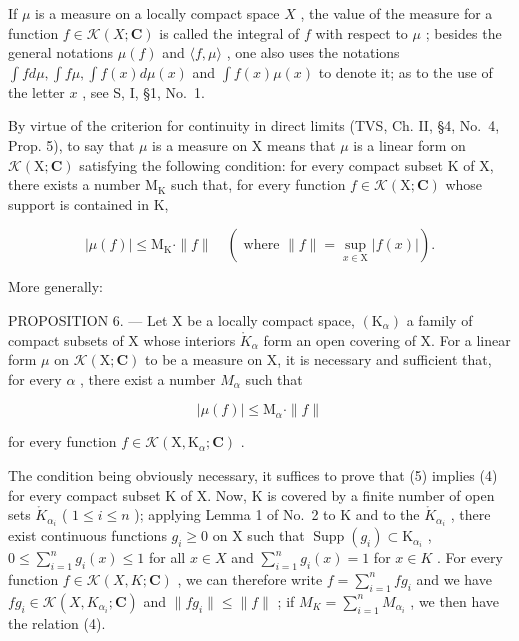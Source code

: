If \(\mu\) is a measure on a locally compact space \(X\) , the value of the measure for a function \(f \in \mathcal{K}(X; \mathbf{C})\) is called the integral of \(f\) with respect to \(\mu\) ; besides the general notations \(\mu(f)\) and \(\langle f, \mu \rangle\) , one also uses the notations \(\int f d\mu, \int f\mu, \int f(x) d\mu(x)\) and \(\int f(x)\mu(x)\) to denote it; as to the use of the letter \(x\) , see S, I, §1, No.~1.

By virtue of the criterion for continuity in direct limits (TVS, Ch. II, §4, No.~4, Prop. 5), to say that \(\mu\) is a measure on X means that \(\mu\) is a linear form on \(\mathcal{K}(\mathrm{X};\mathbf{C})\) satisfying the following condition: for every compact subset K of X, there exists a number \(\mathrm{M_K}\) such that, for every function \(f\in \mathcal{K}(\mathrm{X};\mathbf{C})\) whose support is contained in K,

\[
| \mu (f) | \leqslant \mathrm{M} _ {\mathrm{K}} \cdot \| f \| \quad (\text { where } \| f \| = \sup _ {x \in \mathrm{X}} | f (x) |).\tag{4}
\]

More generally:

PROPOSITION 6. --- Let X be a locally compact space, \((\mathrm{K}_{\alpha})\) a family of compact subsets of X whose interiors \(\mathring{K}_{\alpha}\) form an open covering of X. For a linear form \(\mu\) on \(\mathcal{K}(\mathrm{X};\mathbf{C})\) to be a measure on X, it is necessary and sufficient that, for every \(\alpha\) , there exist a number \(M_{\alpha}\) such that

\[
| \mu (f) | \leqslant \mathrm{M} _ {\alpha} \cdot \| f \|\tag{5}
\]

for every function \(f \in \mathcal{K}(\mathrm{X}, \mathrm{K}_{\alpha}; \mathbf{C})\) .

The condition being obviously necessary, it suffices to prove that (5) implies (4) for every compact subset K of X. Now, K is covered by a finite number of open sets \(\mathring{K}_{\alpha_{i}}\) ( \(1 \leqslant i \leqslant n\) ); applying Lemma 1 of No.~2 to K and to the \(\mathring{K}_{\alpha_{i}}\) , there exist continuous functions \(g_{i} \geqslant 0\) on X such that \(\operatorname{Supp}(g_{i}) \subset \mathrm{K}_{\alpha_{i}}\) , \(0 \leqslant \sum_{i=1}^{n} g_{i}(x) \leqslant 1\) for all \(x \in X\) and \(\sum_{i=1}^{n} g_{i}(x) = 1\) for \(x \in K\) . For every function \(f \in \mathcal{K}(X, K; \mathbf{C})\) , we can therefore write \(f = \sum_{i=1}^{n} fg_{i}\) and we have \(fg_{i} \in \mathcal{K}(X, K_{\alpha_{i}}; \mathbf{C})\) and \(\|fg_{i}\| \leqslant \|f\|\) ; if \(M_{K} = \sum_{i=1}^{n} M_{\alpha_{i}}\) , we then have the relation (4).

